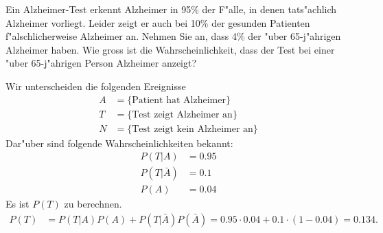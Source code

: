 Ein Alzheimer-Test erkennt Alzheimer in 95\% der F"alle, in denen tats"achlich
Alzheimer vorliegt. Leider zeigt er auch bei 10\% der gesunden Patienten
f"alschlicherweise Alzheimer an. Nehmen Sie an, dass 4\% der "uber 65-j"ahrigen
Alzheimer haben.
Wie gross ist die Wahrscheinlichkeit, dass der Test bei einer "uber
65-j"ahrigen Person Alzheimer anzeigt?

\begin{loesung}
Wir unterscheiden die folgenden Ereignisse
\begin{align*}
A&=\{\text{Patient hat Alzheimer}\}
\\
T&=\{\text{Test zeigt Alzheimer an}\}
\\
N&=\{\text{Test zeigt kein Alzheimer an}\}
\end{align*}
Dar"uber sind folgende Wahrscheinlichkeiten bekannt:
\begin{align*}
P(T|A)&=0.95\\
P(T|\bar A)&=0.1\\
P(A)&=0.04
\end{align*}
Es ist $P(T)$ zu berechnen.
\begin{align*}
P(T)&=P(T|A)P(A)+P(T|\bar A)P(\bar A)=0.95\cdot 0.04 + 0.1\cdot (1-0.04)
=0.134.
\end{align*}
\end{loesung}

